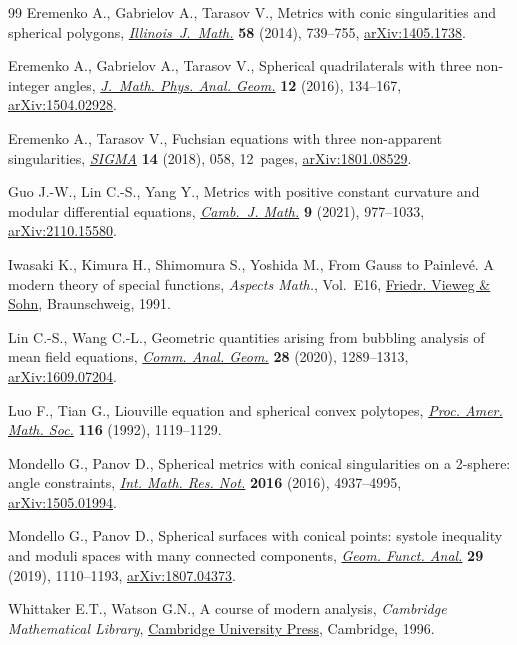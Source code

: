 \begin{thebibliography}{99}
Eremenko A., Gabrielov A., Tarasov V., Metrics with conic singularities and
 spherical polygons, \href{https://doi.org/10.1215/ijm/1441790388}{\textit{Illinois~J.~Math.}} \textbf{58} (2014), 739--755,
 \href{https://arxiv.org/abs/1405.1738}{arXiv:1405.1738}.

Eremenko A., Gabrielov A., Tarasov V., Spherical quadrilaterals with three
 non-integer angles, \href{https://doi.org/10.15407/mag12.02.134}{\textit{J.~Math. Phys. Anal. Geom.}} \textbf{12} (2016),
 134--167, \href{https://arxiv.org/abs/1504.02928}{arXiv:1504.02928}.

Eremenko A., Tarasov V., Fuchsian equations with three non-apparent
 singularities, \href{https://doi.org/10.3842/SIGMA.2018.058}{\textit{SIGMA}} \textbf{14} (2018), 058, 12~pages,
 \href{https://arxiv.org/abs/1801.08529}{arXiv:1801.08529}.

Guo J.-W., Lin C.-S., Yang Y., Metrics with positive constant curvature and
 modular differential equations, \href{https://doi.org/10.4310/CJM.2021.v9.n4.a3}{\textit{Camb.~J. Math.}} \textbf{9} (2021),
 977--1033, \href{https://arxiv.org/abs/2110.15580}{arXiv:2110.15580}.

Iwasaki K., Kimura H., Shimomura S., Yoshida M., From {G}auss to {P}ainlev\'e.
 A modern theory of special functions, \textit{Aspects Math.}, Vol.~E16,
 \href{https://doi.org/10.1007/978-3-322-90163-7}{Friedr. Vieweg \& Sohn}, Braunschweig, 1991.

Lin C.-S., Wang C.-L., Geometric quantities arising from bubbling analysis of
 mean field equations, \href{https://doi.org/10.4310/CAG.2020.v28.n6.a2}{\textit{Comm. Anal. Geom.}} \textbf{28} (2020),
 1289--1313, \href{https://arxiv.org/abs/1609.07204}{arXiv:1609.07204}.

Luo F., Tian G., Liouville equation and spherical convex polytopes,
 \href{https://doi.org/10.2307/2159498}{\textit{Proc. Amer. Math. Soc.}} \textbf{116} (1992), 1119--1129.

Mondello G., Panov D., Spherical metrics with conical singularities on a
 2-sphere: angle constraints, \href{https://doi.org/10.1093/imrn/rnv300}{\textit{Int. Math. Res. Not.}} \textbf{2016}
 (2016), 4937--4995, \href{https://arxiv.org/abs/1505.01994}{arXiv:1505.01994}.

Mondello G., Panov D., Spherical surfaces with conical points: systole
 inequality and moduli spaces with many connected components, \href{https://doi.org/10.1007/s00039-019-00506-3}{\textit{Geom.
 Funct. Anal.}} \textbf{29} (2019), 1110--1193, \href{https://arxiv.org/abs/1807.04373}{arXiv:1807.04373}.

Whittaker E.T., Watson G.N., A course of modern analysis, \textit{Cambridge Mathematical Library}, \href{https://doi.org/10.1017/CBO9780511608759}{Cambridge University Press}, Cambridge, 1996.

\end{thebibliography}\LastPageEnding
